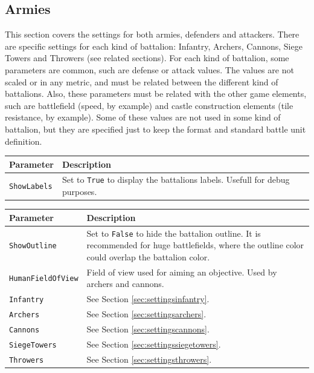 \documentclass[tog]{acmsiggraph}
\begin{document}
\subsection{Armies}
\label{sec:settingsarmy}

This section covers the settings for both armies, defenders and attackers.
There are specific settings for each kind of battalion: Infantry, Archers, Cannons, Siege Towers and Throwers (see related sections).
For each kind of battalion, some parameters are common, such are defense or attack values.
The values are not scaled or in any metric, and must be related between the different kind of battalions.
Also, these parameters must be related with the other game elements, such are battlefield (speed, by example) and castle construction elements (tile resistance, by example).
Some of these values are not used in some kind of battalion, but they are specified just to keep the format and standard battle unit definition.


\begin{tabularx}{0.48\textwidth}{ |l|X| }
\hline 
\textbf{Parameter} & \textbf{Description} \\[0.15cm]
 \hline
 \texttt{ShowLabels} & Set to \texttt{True} to display the battalions labels. Usefull for debug purposes.\\
 \hline
\end{tabularx}  
 
\begin{tabularx}{0.48\textwidth}{ |l|X| }
\hline 
\textbf{Parameter} & \textbf{Description} \\[0.15cm]
 \hline
 \texttt{ShowOutline} & Set to \texttt{False} to hide the battalion outline. It is recommended for huge battlefields, where the outline color could overlap the battalion color. \\
 \hline
 \texttt{HumanFieldOfView} & Field of view used for aiming an objective. Used by archers and cannons. \\
 \hline
 \texttt{Infantry} & See Section \ref{sec:settingsinfantry}. \\
 \hline
 \texttt{Archers} & See Section \ref{sec:settingsarchers}. \\
 \hline
 \texttt{Cannons} & See Section \ref{sec:settingscannons}. \\
 \hline
 \texttt{SiegeTowers} & See Section \ref{sec:settingssiegetowers}. \\
 \hline
 \texttt{Throwers} & See Section \ref{sec:settingsthrowers}. \\
 \hline
\end{tabularx} 
\end{document}

